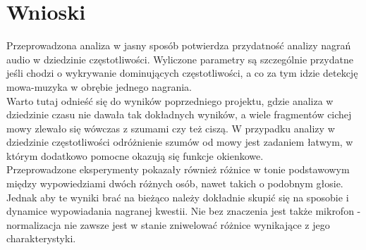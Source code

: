 \documentclass[a4paper]{article}
\begin{document}
\section{Wnioski}
Przeprowadzona analiza w jasny sposób potwierdza przydatność analizy nagrań audio w dziedzinie częstotliwości. Wyliczone parametry są szczególnie przydatne jeśli chodzi o wykrywanie dominujących częstotliwości, a co za tym idzie detekcję mowa-muzyka w obrębie jednego nagrania.\\
Warto tutaj odnieść się do wyników poprzedniego projektu, gdzie analiza w dziedzinie czasu nie dawała tak dokładnych wyników, a wiele fragmentów cichej mowy zlewało się wówczas z szumami czy też ciszą. W przypadku analizy w dziedzinie częstotliwości odróżnienie szumów od mowy jest zadaniem łatwym, w którym dodatkowo pomocne okazują się funkcje okienkowe.\\
Przeprowadzone eksperymenty pokazały również różnice w tonie podstawowym między wypowiedziami dwóch różnych osób, nawet takich o podobnym głosie. Jednak aby te wyniki brać na bieżąco należy dokładnie skupić się na sposobie i dynamice wypowiadania nagranej kwestii. Nie bez znaczenia jest także mikrofon - normalizacja nie zawsze jest w stanie zniwelować różnice wynikające z jego charakterystyki.


\end{document}
